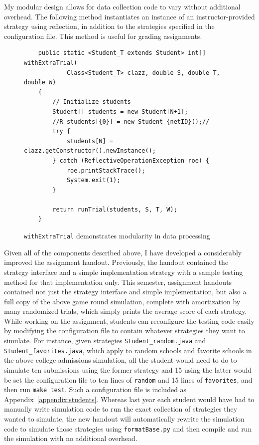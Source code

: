 \documentclass[pageno]{jpaper}
\begin{document}
My modular design allows for data collection code to vary without additional overhead.
The following method instantiates an instance of an instructor-provided strategy using reflection, in addition to the strategies specified in the configuration file.
This method is useful for grading assignments.
\begin{figure}[hbt]
\begin{verbatim}
    public static <Student_T extends Student> int[] withExtraTrial(
            Class<Student_T> clazz, double S, double T, double W)
    {
        // Initialize students
        Student[] students = new Student[N+1];
        //R students[{0}] = new Student_{netID}();//
        try {
            students[N] = clazz.getConstructor().newInstance();
        } catch (ReflectiveOperationException roe) {
            roe.printStackTrace();
            System.exit(1);
        }

        return runTrial(students, S, T, W);
    }
\end{verbatim}
  \caption{\texttt{withExtraTrial} demonstrates modularity in data processing}\label{minted:withExtraTrial}
\end{figure}

Given all of the components described above, I have developed a considerably improved the assignment handout.
Previously, the handout contained the strategy interface and a simple implementation strategy with a sample testing method for that implementation only.
This semester, assignment handouts contained not just the strategy interface and simple implementation, but also a full copy of the above game round simulation, complete with amortization by many randomized trials, which simply prints the average score of each strategy.
While working on the assignment, students can reconfigure the testing code easily by modifying the configuration file to contain whatever strategies they want to simulate.
For instance, given strategies \texttt{Student\_random.java} and \texttt{Student\_favorites.java}, which apply to random schools and favorite schools in the above college admissions simulation, all the student would need to do to simulate ten submissions using the former strategy and 15 using the latter would be set the configuration file to ten lines of \texttt{random} and 15 lines of \texttt{favorites}, and then run \texttt{make test}.
Such a configuration file is included as Appendix~\ref{appendix:students}.
Whereas last year each student would have had to manually write simulation code to run the exact collection of strategies they wanted to simulate, the new handout will automatically rewrite the simulation code to simulate those strategies using \texttt{formatBase.py} and then compile and run the simulation with no additional overhead.
\end{document}
